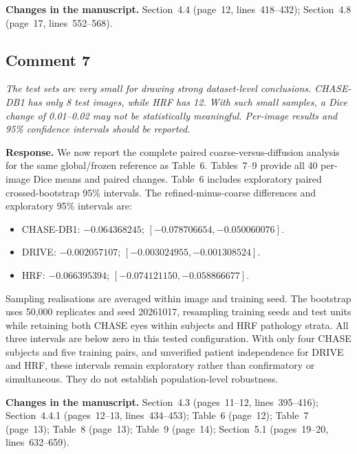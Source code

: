 \documentclass[11pt,a4paper]{article}
\newenvironment{revcomment}{\par\medskip\noindent\begin{minipage}{\linewidth}\itshape}{\end{minipage}\par\smallskip}
\begin{document}
\textbf{Changes in the manuscript.} Section~4.4 (page~12, lines~418--432); Section~4.8 (page~17, lines~552--568).

\subsection*{Comment 7}
\begin{revcomment}The test sets are very small for drawing strong dataset-level conclusions. CHASE-DB1 has only 8 test images, while HRF has 12. With such small samples, a Dice change of 0.01--0.02 may not be statistically meaningful. Per-image results and 95\% confidence intervals should be reported.\end{revcomment}
\textbf{Response.} We now report the complete paired coarse-versus-diffusion analysis for the same global/frozen reference as Table~6. Tables~7--9 provide all 40 per-image Dice means and paired changes. Table~6 includes exploratory paired crossed-bootstrap 95\% intervals. The refined-minus-coarse differences and exploratory 95\% intervals are:
\begin{itemize}[leftmargin=1.5em,itemsep=2pt]
\item CHASE-DB1: $-0.064368245$; $[-0.078706654,-0.050060076]$.
\item DRIVE: $-0.002057107$; $[-0.003024955,-0.001308524]$.
\item HRF: $-0.066395394$; $[-0.074121150,-0.058866677]$.
\end{itemize}
Sampling realisations are averaged within image and training seed. The bootstrap uses 50,000 replicates and seed 20261017, resampling training seeds and test units while retaining both CHASE eyes within subjects and HRF pathology strata. All three intervals are below zero in this tested configuration. With only four CHASE subjects and five training pairs, and unverified patient independence for DRIVE and HRF, these intervals remain exploratory rather than confirmatory or simultaneous. They do not establish population-level robustness.

\textbf{Changes in the manuscript.} Section~4.3 (pages~11--12, lines~395--416); Section~4.4.1 (pages~12--13, lines~434--453); Table~6 (page~12); Table~7 (page~13); Table~8 (page~13); Table~9 (page~14); Section~5.1 (pages~19--20, lines~632--659).
\end{document}

